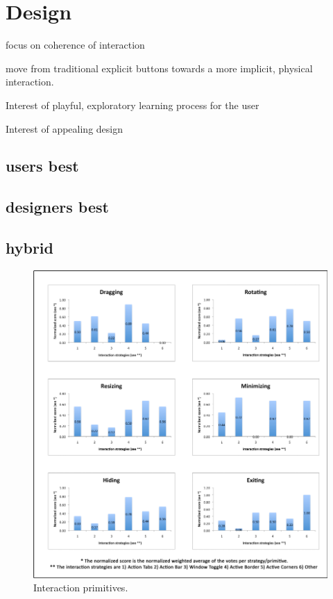 

\chapter{Design}

focus on coherence of interaction

move from traditional explicit buttons towards a more implicit, physical interaction.

Interest of playful, exploratory learning process for the user

Interest of appealing design

\section{users best}

\section{designers best}

\section{hybrid}


\begin{figure}[]
  \caption{Interaction primitives.}
  \centering
    \includegraphics[]{images/primHistog}
\end{figure}

